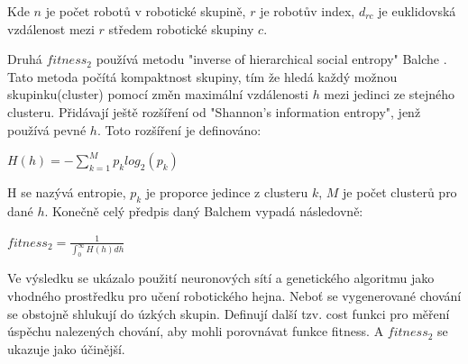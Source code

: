 \par 
Kde $n$ je počet robotů v robotické skupině, $r$ je robotův index, $d_{rc}$ je euklidovská vzdálenost mezi $r$ středem robotické skupiny $c$. 
\par
Druhá $fitness_2$ používá metodu "inverse of hierarchical social entropy" Balche \citep{balch2000hierarchic}. Tato metoda počítá kompaktnost skupiny, tím že hledá každý možnou skupinku(cluster) pomocí změn maximální vzdálenosti $h$ mezi jedinci ze stejného clusteru. Přidávají ještě rozšíření od "Shannon's information entropy", jenž používá pevné $h$. Toto rozšíření je definováno: 
\par 
\begin{center}
\textbf{$H(h)=-\sum\limits_{k=1}^{M} p_k log_2(p_k)$}
\end{center}
\par 
H se nazývá entropie, $p_k$ je proporce jedince z clusteru $k$, $M$ je počet clusterů pro dané $h$. Konečně celý předpis daný Balchem vypadá následovně: 
\par
\begin{center}
\textbf{$fitness_2 = \frac{1}{\int_{0}^{\infty}H(h)dh}$}
\end{center}
\par 
Ve výsledku se ukázalo použití neuronových sítí a genetického algoritmu jako vhodného prostředku pro učení robotického hejna. Neboť se vygenerované chování se obstojně shlukují do úzkých skupin. Definují další tzv. cost funkci pro měření úspěchu nalezených chování, aby mohli porovnávat funkce fitness. A $fitness_2$ se ukazuje jako účinější. 

